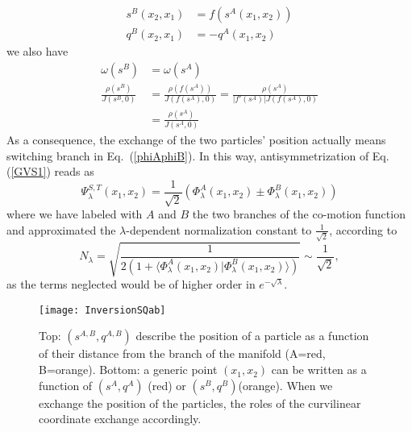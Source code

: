 \documentclass[aps,pra,twocolumn,superscriptaddress]{revtex4}
\begin{document}
\begin{equation}
\begin{aligned}
s^B(x_2,x_1)&=f(s^A(x_1,x_2))\\q^B(x_2,x_1)&=-q^A(x_1,x_2)
\end{aligned}
\end{equation} we also have 
\begin{equation}
\begin{aligned}
\omega(s^B)&=\omega(s^A)\\\frac{\rho(s^B)}{J(s^B,0)}&=\frac{\rho(f(s^A))}{J(f(s^A),0)}=\frac{\rho(s^A)}{\vert f'(s^A)\vert J(f(s^A),0)}\\&=\frac{\rho(s^A)}{J(s^A,0)}
\end{aligned}
\end{equation}
As a consequence, the exchange of the two particles' position actually means switching branch in Eq.~(\ref{phiAphiB}).
In this way, antisymmetrization of Eq.(\ref{GVS1}) reads as
 \begin{equation}
\Psi_{\lambda}^{S,T}\left(x_1,x_2\right)=\frac{1}{\sqrt{2}}\left(\Phi^A_{\lambda}\left(x_1,x_2\right)\pm\Phi^B_{\lambda}\left(x_1,x_2\right)\right)
\end{equation}where we have labeled with $A$ and $B$ the two branches of the co-motion function and approximated the $\lambda$-dependent normalization constant to $\frac{1}{\sqrt{2}}$, according to \begin{equation}
N_{\lambda}=\sqrt{\frac{1}{2\left(1+\langle\Phi^A_{\lambda}\left(x_1,x_2\right)\vert\Phi^B_{\lambda}\left(x_1,x_2\right)\rangle\right)}}\sim\frac{1}{\sqrt{2}},
\end{equation}
as the terms neglected would be of higher order in $e^{-\sqrt{\lambda}}$.
\begin{figure}
\texttt{[image: InversionSQab]}
\caption{\label{sAsB}Top: $(s^{A,B},q^{A,B})$ describe the position of a particle as a function of their distance from the branch of the manifold (A=red, B=orange). Bottom: a generic point $(x_1,x_2)$ can be written as a function of $(s^{A},q^{A})$ (red) or $(s^{B},q^{B})$(orange). When we exchange the position of the particles, the roles of the curvilinear coordinate exchange accordingly.}
\end{figure} 
\end{document}
